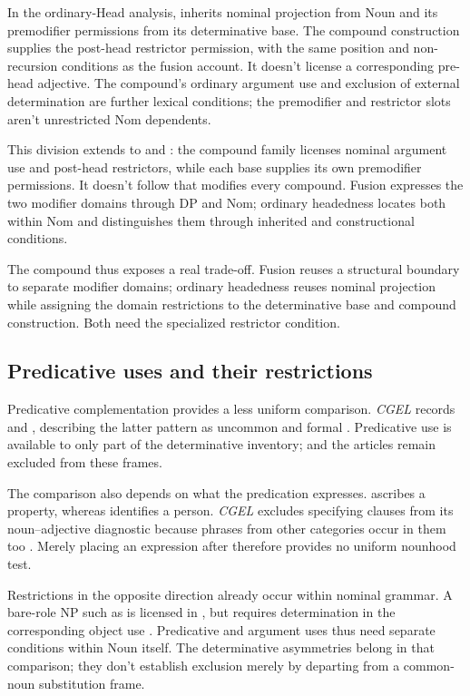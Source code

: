 \documentclass[12pt]{article}
\begin{document}
In the ordinary-Head analysis,  inherits nominal projection from Noun and its premodifier permissions from its determinative base. The compound construction supplies the post-head restrictor permission, with the same position and non-recursion conditions as the fusion account. It doesn't license a corresponding pre-head adjective. The compound's ordinary argument use and exclusion of external determination are further lexical conditions; the premodifier and restrictor slots aren't unrestricted Nom dependents.

This division extends to  and : the compound family licenses nominal argument use and post-head restrictors, while each base supplies its own premodifier permissions. It doesn't follow that  modifies every compound. Fusion expresses the two modifier domains through DP and Nom; ordinary headedness locates both within Nom and distinguishes them through inherited and constructional conditions.

The compound thus exposes a real trade-off. Fusion reuses a structural boundary to separate modifier domains; ordinary headedness reuses nominal projection while assigning the domain restrictions to the determinative base and compound construction. Both need the specialized restrictor condition.

\subsection{Predicative uses and their restrictions}\label{sec:predication}

Predicative complementation provides a less uniform comparison. \textit{CGEL} records  and , describing the latter pattern as uncommon and formal \citep[392, 395--396]{huddleston2002}. Predicative use is available to only part of the determinative inventory;  and the articles remain excluded from these frames.

The comparison also depends on what the predication expresses.  ascribes a property, whereas  identifies a person. \textit{CGEL} excludes specifying  clauses from its noun--adjective diagnostic because phrases from other categories occur in them too \citep[536]{huddleston2002}. Merely placing an expression after  therefore provides no uniform nounhood test.

Restrictions in the opposite direction already occur within nominal grammar. A bare-role NP such as  is licensed in , but requires determination in the corresponding object use  \citep[328]{huddleston2002}. Predicative and argument uses thus need separate conditions within Noun itself. The determinative asymmetries belong in that comparison; they don't establish exclusion merely by departing from a common-noun substitution frame.
\end{document}
